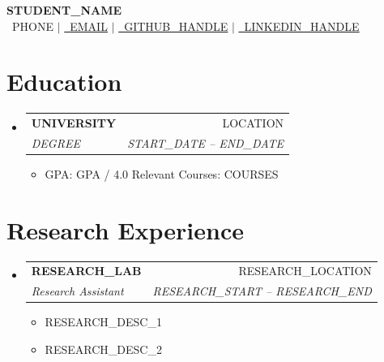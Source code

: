 \documentclass[letterpaper,11pt]{article}
\makeatletter
\newcommand{\resumeItem}[1]{
  \item\small{#1 \vspace{-2pt}}
}
\newcommand{\resumeSubheading}[4]{
  \vspace{-2pt}\item
    \begin{tabular*}{0.97\textwidth}[t]{l@{\extracolsep{\fill}}r}
      \textbf{#1} & #2 \\
      \textit{\small#3} & \textit{\small #4} \\
    \end{tabular*}\vspace{-7pt}
}
\newcommand{\resumeItemListStart}{\begin{itemize}}
\newcommand{\resumeItemListEnd}{\end{itemize}\vspace{-5pt}}
\newcommand{\resumeSubHeadingListStart}{\begin{itemize}[leftmargin=0.15in, label={}]}
\newcommand{\resumeSubHeadingListEnd}{\end{itemize}}
\makeatother
\begin{document}
\begin{center}
  \textbf{\Huge \scshape {{STUDENT_NAME}}} \\ \vspace{1pt}
  \small
  \faPhone\ {{PHONE}} $|$
  \href{mailto:{{EMAIL}}}{\faEnvelope\ \underline{{{EMAIL}}}} $|$
  \href{{{GITHUB_URL}}}{\faGithub\ \underline{{{GITHUB_HANDLE}}}} $|$
  \href{{{LINKEDIN_URL}}}{\faLinkedin\ \underline{{{LINKEDIN_HANDLE}}}}
\end{center}

\section{Education}
\resumeSubHeadingListStart
  \resumeSubheading
    {{{UNIVERSITY}}}{{{LOCATION}}}
    {{{DEGREE}}}{{{START_DATE}} -- {{END_DATE}}}
    \resumeItemListStart
      \resumeItem{GPA: {{GPA}} / 4.0 \quad
                  Relevant Courses: {{COURSES}}}
    \resumeItemListEnd
\resumeSubHeadingListEnd

\section{Research Experience}
\resumeSubHeadingListStart
  \resumeSubheading
    {{{RESEARCH_LAB}}}{{{RESEARCH_LOCATION}}}
    {Research Assistant}{{{RESEARCH_START}} -- {{RESEARCH_END}}}
    \resumeItemListStart
      \resumeItem{{{RESEARCH_DESC_1}}}
      \resumeItem{{{RESEARCH_DESC_2}}}
    \resumeItemListEnd
\resumeSubHeadingListEnd

\end{document}
